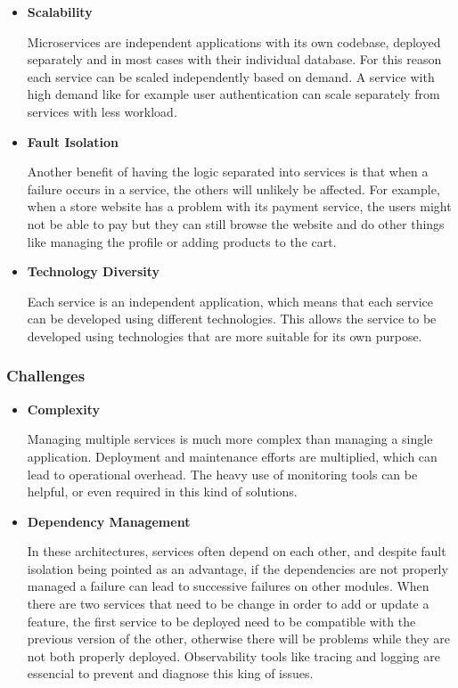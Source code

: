 \begin{itemize}
	\item \textbf{Scalability}

	      Microservices are independent applications with its own codebase, deployed
	      separately and in most cases with their individual database. For this reason
	      each service can be scaled independently based on demand. A service with
	      high demand like for example user authentication can scale separately from
	      services with less workload\cite{8990350}.

	\item \textbf{Fault Isolation}

	      Another benefit of having the logic separated into services is that when
	      a failure occurs in a service, the others will unlikely be affected. For
	      example, when a store website has a problem with its payment service, the
	      users might not be able to pay but they can still browse the website and
	      do other things like managing the profile or adding products to the cart\cite{8990350}.

	\item \textbf{Technology Diversity}

	      Each service is an independent application, which means that each service
	      can be developed using different technologies\cite{7436659}. This allows the service to
	      be developed using technologies that are more suitable for its own purpose.

\end{itemize}

\subsubsection{Challenges}
\begin{itemize}
	\item \textbf{Complexity}

	      Managing multiple services is much more complex than managing a single
	      application\cite{newman2019monolith}. Deployment and maintenance efforts are multiplied, which can
	      lead to operational overhead. The heavy use of monitoring tools can be
	      helpful, or even required in this kind of solutions.

	\item \textbf{Dependency Management}

	      In these architectures, services often depend on each other, and despite
	      fault isolation being pointed as an advantage, if the dependencies are not
	      properly managed a failure can lead to successive failures on other modules.
	      When there are two services that need to be change in order to add or update
	      a feature, the first service to be deployed need to be compatible with the
	      previous version of the other, otherwise there will be problems while they
	      are not both properly deployed.
	      Observability tools like tracing and logging are essencial to prevent and
	      diagnose this king of issues\cite{richards2015software}.
\end{itemize}


